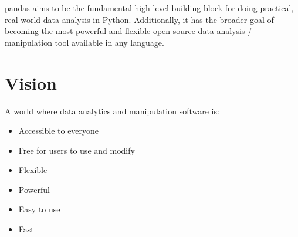 \documentclass[a4paper, 11pt]{article}
\begin{document}
pandas aims to be the fundamental high-level building block for doing practical, real world data analysis in Python. Additionally, it has the broader goal of becoming the most powerful and flexible open source data analysis / manipulation tool available in any language.

\section{Vision}

A world where data analytics and manipulation software is:

\begin{itemize}
\item Accessible to everyone
\item Free for users to use and modify
\item Flexible
\item Powerful
\item Easy to use
\item Fast
\end{itemize}
\end{document}
